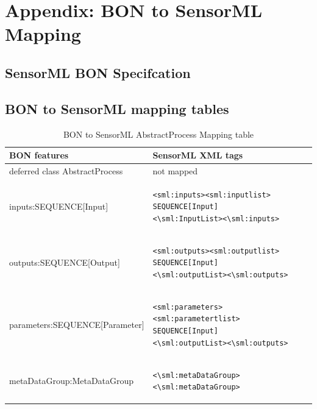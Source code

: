 \documentclass[]{final_report}
\begin{document}
\chapter{Appendix: BON to SensorML Mapping}\label{appenB}
\section {SensorML BON Specifcation}\label{appenBSMLBONSpec}

\lstset{basicstyle=\scriptsize,showspaces=false,showstringspaces=false}

\section {BON to SensorML mapping tables} \label{appenBSMLBONTables}
\lstset{frame=none}
\begin{table}[!th]
\centering
\begin{tabular}{|l|l|}
\hline
BON features & SensorML XML tags\\
\hline
   deferred class AbstractProcess  & not mapped\\
\hline     
     inputs:SEQUENCE[Input] & \begin{lstlisting}
<sml:inputs><sml:inputlist>
SEQUENCE[Input]
<\sml:InputList><\sml:inputs>\end{lstlisting}\\

\hline 
     outputs:SEQUENCE[Output] & \begin{lstlisting}
<sml:outputs><sml:outputlist>
SEQUENCE[Input]
<\sml:outputList><\sml:outputs>\end{lstlisting}\\
\hline
     parameters:SEQUENCE[Parameter] & \begin{lstlisting}
<sml:parameters><sml:parametertlist>
SEQUENCE[Input]
<\sml:outputList><\sml:outputs>\end{lstlisting}\\

\hline                 
     metaDataGroup:MetaDataGroup &  \begin{lstlisting}
<\sml:metaDataGroup><\sml:metaDataGroup>\end{lstlisting}\\
 \hline    

\end{tabular}
\caption{BON to SensorML AbstractProcess Mapping table}\label{table:bon_sml_example}
\label{ex:table}
\end{table}
\end{document}

